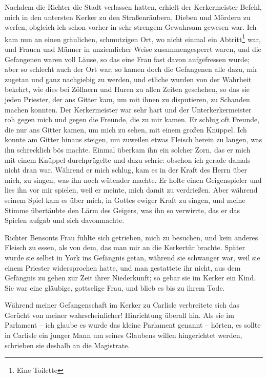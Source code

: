 Nachdem die Richter die Stadt verlassen hatten, erhielt der
Kerkermeister Befehl, mich in den untersten Kerker zu den 
Straßenräubern, Dieben und Mördern zu werfen, obgleich ich schon 
vorher in sehr strengem Gewahrsam gewesen war. Ich kam nun
an einen gräulichen, schmutzigen Ort, wo nicht einmal 
ein Abtritt\footnote{Eine Toilette}
war, und Frauen und Männer in unziemlicher Weise 
zusammengesperrt waren, und die Gefangenen waren voll Läuse, 
so das eine
Frau fast davon aufgefressen wurde; aber so schlecht auch der
Ort war, so kamen doch die Gefangenen alle dazu, mir zugetan
und ganz nachgiebig zu werden, und etliche wurden von der 
Wahrheit bekehrt, wie dies bei Zöllnern und Huren zu allen Zeiten
geschehen, so das sie jeden Priester, der ans Gitter kam, um mit
ihnen zu disputieren, zu Schanden machen konnten. Der 
Kerkermeister war sehr hart und der 
Unterkerkermeister roh gegen mich und
gegen die Freunde, die zu mir kamen. Er schlug oft Freunde,
die nur ans Gitter kamen, um mich zu sehen, mit einem großen
Knüppel. Ich konnte am Gitter hinaus steigen, um zuweilen etwas
Fleisch herein zu langen, was ihn schrecklich bös machte. Einmal
überkam ihn ein solcher Zorn, das er mich mit einem Knüppel
durchprügelte und dazu schrie:  obschon
ich gerade damals nicht dran war. Während er mich schlug,
kam es in der Kraft des Herrn über mich, zu singen, was ihn
noch wütender machte. Er holte einen 
Geigenspieler und lies
ihn vor mir spielen, weil er meinte, mich damit zu verdrießen.
Aber während seinem Spiel kam es über mich, in Gottes ewiger
Kraft zu singen, und meine Stimme übertäubte den Lärm des
Geigers, was ihn so verwirrte, das er das Spielen aufgab und
sich davonmachte.


Richter Bensonts Frau fühlte sich getrieben, mich zu besuchen,
und kein anderes Fleisch zu essen, als von dem, das man mir
an die Kerkertür brachte. Später wurde sie selbst in York ins
Gefängnis getan, während sie schwanger war, weil sie einem
Priester widersprochen hatte, und man gestattete ihr nicht, aus
dem Gefängnis zu gehen zur Zeit ihrer Niederkunft; so gebar
sie im Kerker ein Kind. Sie war eine gläubige, gottselige Frau,
und blieb es bis zu ihrem Tode.


Während meiner Gefangenschaft im Kerker zu Carlisle 
verbreitete sich das Gerücht von meiner wahrscheinlicher! Hinrichtung
überall hin. Als sie im Parlament -- ich glaube es wurde das
kleine Parlament genannt -- hörten, es sollte in Carlisle ein
junger Mann um seines Glaubens willen hingerichtet werden,
schrieben sie deshalb an die Magistrate.

